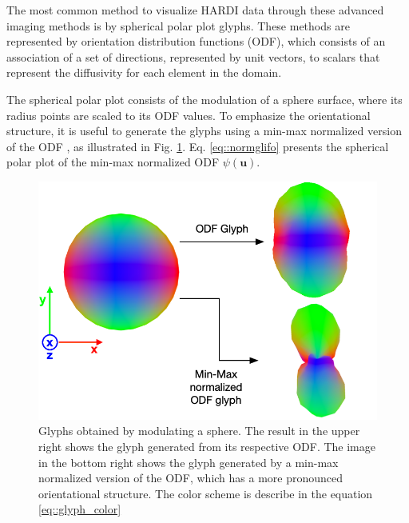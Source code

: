 \documentclass[twoside,twocolumn,10pt]{article}
\begin{document}
The most common method to visualize HARDI data through these advanced imaging methods is by spherical polar plot glyphs. These methods are represented by orientation distribution functions (ODF), which consists of an association of a set of directions, represented by unit vectors, to scalars that represent the diffusivity for each element in the domain.

The spherical polar plot consists of the modulation of a sphere surface, where its radius points are scaled to its ODF values. To emphasize the orientational structure, it is useful to generate the glyphs using a min-max normalized version of the ODF \cite{TuchQBall2004}, as illustrated in Fig. \ref{fig::intro_glyph}. Eq. \ref{eq::normglifo} presents the spherical polar plot of the min-max normalized ODF $\psi(\bm{u})$.

\begin{figure}[htb]
    \centering
    \includegraphics[width=1.00\linewidth, angle=0]{figs/SphericalMeshModulation.png}
    \caption{Glyphs obtained by modulating a sphere. The result in the upper right shows the glyph generated from its respective ODF. The image in the bottom right shows the glyph generated by a min-max normalized version of the ODF, which has a more pronounced orientational structure. The color scheme is describe in the equation \ref{eq::glyph_color}}
    \label{fig::intro_glyph}
\end{figure}

\end{document}
